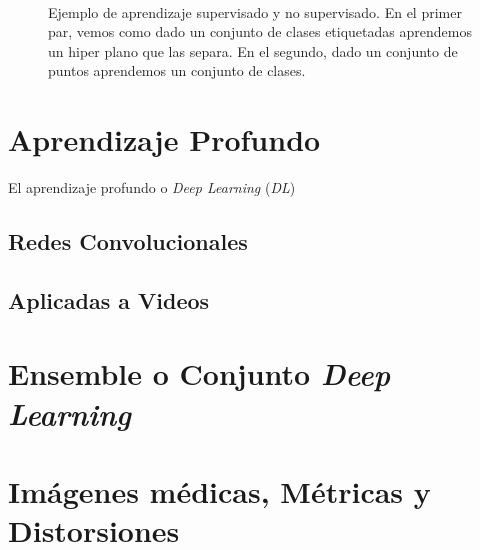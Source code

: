 \begin{figure}[htp]
  \begin{center}
    \\ 
  \end{center}
  \caption{Ejemplo de aprendizaje supervisado y no supervisado. En el primer par, 
  vemos como dado un conjunto de clases etiquetadas aprendemos un hiper plano que 
  las separa. En el segundo, dado un conjunto de puntos aprendemos un conjunto de clases.
}
  \label{fig:MLExamples}
\end{figure}

\section{Aprendizaje Profundo}
El aprendizaje profundo o \emph{Deep Learning} (\emph{DL}) 
\subsection{Redes Convolucionales} 
\subsection{Aplicadas a Videos} 
\section{Ensemble o Conjunto \emph{Deep Learning}}
\section{Imágenes médicas, Métricas y Distorsiones}
\label{sec:Distorsiones}

